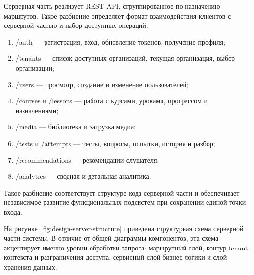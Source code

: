 Серверная часть реализует REST API, сгруппированное по назначению маршрутов. Такое разбиение определяет формат взаимодействия клиентов с серверной частью и набор доступных операций.
\begin{enumerate}
  \item /auth --- регистрация, вход, обновление токенов, получение профиля;
  \item /tenants --- список доступных организаций, текущая организация, выбор организации;
  \item /users --- просмотр, создание и изменение пользователей;
  \item /courses и /lessons --- работа с курсами, уроками, прогрессом и назначениями;
  \item /media --- библиотека и загрузка медиа;
  \item /tests и /attempts --- тесты, вопросы, попытки, история и разбор;
  \item /recommendations --- рекомендации слушателя;
  \item /analytics --- сводная и детальная аналитика.
\end{enumerate}

Такое разбиение соответствует структуре кода серверной части и обеспечивает независимое развитие функциональных подсистем при сохранении единой точки входа.

На рисунке~\ref{fig:design-server-structure} приведена структурная схема серверной части системы. В отличие от общей диаграммы компонентов, эта схема акцентирует именно уровни обработки запроса: маршрутный слой, контур tenant-контекста и разграничения доступа, сервисный слой бизнес-логики и слой хранения данных.

